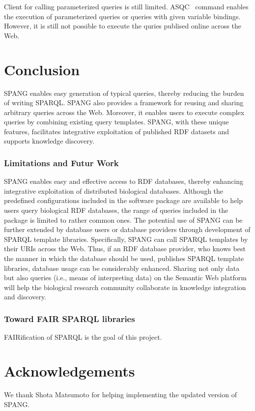 \documentclass[runningheads]{llncs}
\begin{document}
Client for calling parameterized queries is still limited.
ASQC~\cite{asqc} command enables the execution of parameterized queries or queries with given variable bindings. However, it is still not possible to execute the quries publised online across the Web.

\section{Conclusion}
SPANG enables easy generation of typical queries, thereby reducing the burden of writing SPARQL. SPANG also provides a framework for reusing and sharing arbitrary queries across the Web. Moreover, it enables users to execute complex queries by combining existing query templates. SPANG, with these unique features, facilitates integrative exploitation of published RDF datasets and supports knowledge discovery. 

\subsubsection{Limitations and Futur Work}
SPANG enables easy and effective access to RDF databases, thereby enhancing integrative exploitation of distributed biological databases.
Although the predefined configurations included in the software package are available to help users query biological RDF databases, 
the range of queries included in the package is limited to rather common ones.
The potential use of SPANG can be further extended by database users or database providers through development of SPARQL template libraries.
Specifically, SPANG can call SPARQL templates by their URIs across the Web.
Thus, if an RDF database provider,
who knows best the manner in which the database should be used,
publishes SPARQL template libraries, database usage can be considerably enhanced.
Sharing not only data but also queries (i.e., means of interpreting data) on the Semantic Web platform will help the biological research community collaborate in knowledge integration and discovery.

\subsubsection{Toward FAIR SPARQL libraries}
FAIRification of SPARQL is the goal of this project.



\section*{Acknowledgements}
We thank Shota Matsumoto for helping implementing the updated version of SPANG.
\end{document}
